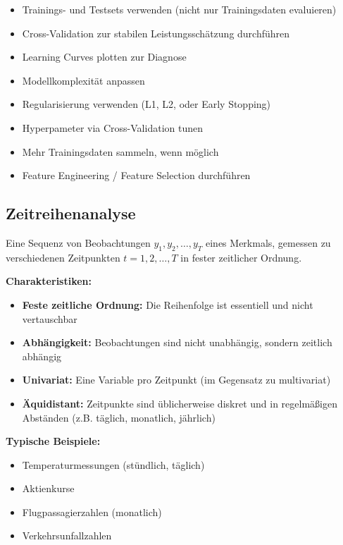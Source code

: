 
\begin{itemize}[leftmargin=1.5em]
    \item  Trainings- und Testsets verwenden (nicht nur Trainingsdaten evaluieren)
    \item  Cross-Validation zur stabilen Leistungsschätzung durchführen
    \item  Learning Curves plotten zur Diagnose
    \item  Modellkomplexität anpassen
    \item  Regularisierung verwenden (L1, L2, oder Early Stopping)
    \item  Hyperpameter via Cross-Validation tunen
    \item  Mehr Trainingsdaten sammeln, wenn möglich
    \item  Feature Engineering / Feature Selection durchführen
\end{itemize}

\newpage

\subsection{Zeitreihenanalyse}

Eine Sequenz von Beobachtungen $y_1, y_2, \ldots, y_T$ eines Merkmals, gemessen zu verschiedenen Zeitpunkten $t = 1, 2, \ldots, T$ in fester zeitlicher Ordnung.

\textbf{Charakteristiken:}
\begin{itemize}[leftmargin=1.5em]
    \item \textbf{Feste zeitliche Ordnung:} Die Reihenfolge ist essentiell und nicht vertauschbar
    \item \textbf{Abhängigkeit:} Beobachtungen sind nicht unabhängig, sondern zeitlich abhängig
    \item \textbf{Univariat:} Eine Variable pro Zeitpunkt (im Gegensatz zu multivariat)
    \item \textbf{Äquidistant:} Zeitpunkte sind üblicherweise diskret und in regelmäßigen Abständen (z.B. täglich, monatlich, jährlich)
\end{itemize}

\textbf{Typische Beispiele:}
\begin{itemize}[leftmargin=1.5em]
    \item Temperaturmessungen (stündlich, täglich)
    \item Aktienkurse
    \item Flugpassagierzahlen (monatlich)
    \item Verkehrsunfallzahlen
\end{itemize}

